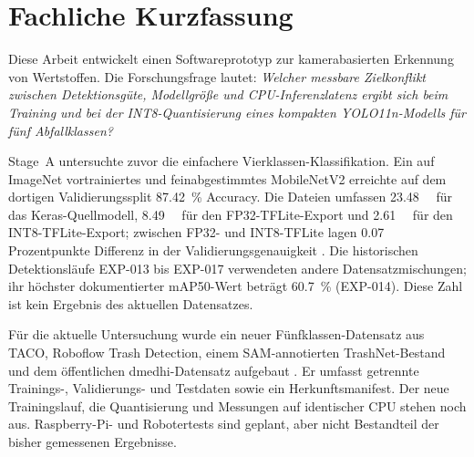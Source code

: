 \section*{Fachliche Kurzfassung}

Diese Arbeit entwickelt einen Softwareprototyp zur kamerabasierten Erkennung von Wertstoffen. Die Forschungsfrage lautet: \emph{Welcher messbare Zielkonflikt zwischen Detektionsgüte, Modellgröße und CPU-Inferenzlatenz ergibt sich beim Training und bei der INT8-Quantisierung eines kompakten YOLO11n-Modells für fünf Abfallklassen?}

Stage~A untersuchte zuvor die einfachere Vierklassen-Klassifikation. Ein auf ImageNet vortrainiertes und feinabgestimmtes MobileNetV2 erreichte auf dem dortigen Validierungssplit \SI{87.42}{\percent} Accuracy. Die Dateien umfassen \SI{23.48}{\mebi\byte} für das Keras-Quellmodell, \SI{8.49}{\mebi\byte} für den FP32-TFLite-Export und \SI{2.61}{\mebi\byte} für den INT8-TFLite-Export; zwischen FP32- und INT8-TFLite lagen \num{0.07} Prozentpunkte Differenz in der Validierungsgenauigkeit \autocite{yosinski2014transferable,krishnamoorthi2018quantizing}. Die historischen Detektionsläufe EXP-013 bis EXP-017 verwendeten andere Datensatzmischungen; ihr höchster dokumentierter mAP50-Wert beträgt \SI{60.7}{\percent} (EXP-014). Diese Zahl ist kein Ergebnis des aktuellen Datensatzes.

Für die aktuelle Untersuchung wurde ein neuer Fünfklassen-Datensatz aus TACO, Roboflow Trash Detection, einem SAM-annotierten TrashNet-Bestand und dem öffentlichen dmedhi-Datensatz aufgebaut \autocite{proenca2020taco,yang2016classification,kirillov2023segment,roboflow2023trash,dmedhiGarbageDataset}. Er umfasst getrennte Trainings-, Validierungs- und Testdaten sowie ein Herkunftsmanifest. Der neue Trainingslauf, die Quantisierung und Messungen auf identischer CPU stehen noch aus. Raspberry-Pi- und Robotertests sind geplant, aber nicht Bestandteil der bisher gemessenen Ergebnisse.
